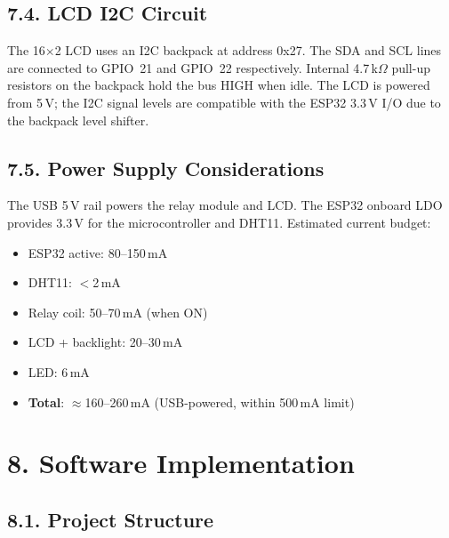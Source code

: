 \documentclass[12pt]{article}
\begin{document}
\subsection*{7.4. LCD I2C Circuit}

The 16$\times$2 LCD uses an I2C backpack at address 0x27.  The SDA and SCL lines
are connected to GPIO~21 and GPIO~22 respectively.  Internal 4.7\,k$\Omega$
pull-up resistors on the backpack hold the bus HIGH when idle.  The LCD is powered
from 5\,V; the I2C signal levels are compatible with the ESP32 3.3\,V I/O due to
the backpack level shifter.

\subsection*{7.5. Power Supply Considerations}

The USB 5\,V rail powers the relay module and LCD.  The ESP32 onboard LDO provides
3.3\,V for the microcontroller and DHT11.  Estimated current budget:
\begin{itemize}
    \item ESP32 active: 80--150\,mA
    \item DHT11: $<$2\,mA
    \item Relay coil: 50--70\,mA (when ON)
    \item LCD + backlight: 20--30\,mA
    \item LED: 6\,mA
    \item \textbf{Total}: $\approx$160--260\,mA (USB-powered, within 500\,mA limit)
\end{itemize}

\section*{8. Software Implementation}

\subsection*{8.1. Project Structure}
\end{document}
